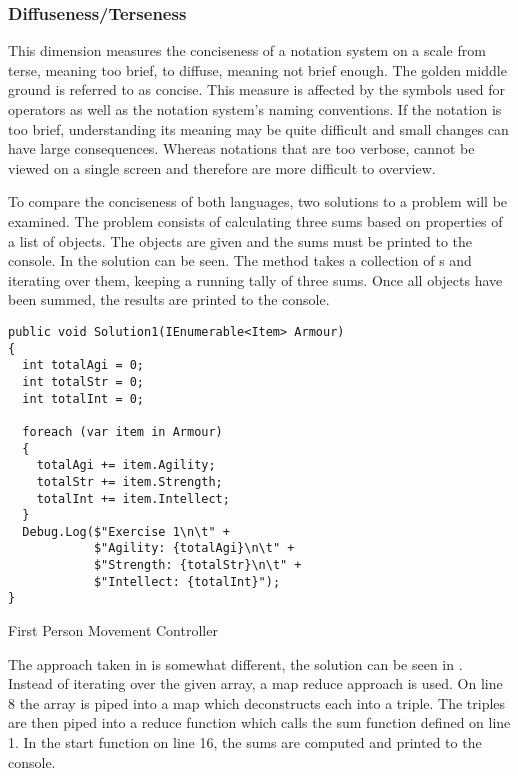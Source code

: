 \subsubsection{Diffuseness/Terseness} %
This dimension measures the conciseness of a notation system on a scale from terse, meaning too brief, to diffuse, meaning not brief enough. The golden middle ground is referred to as concise. This measure is affected by the symbols used for operators as well as the notation system's naming conventions. If the notation is too brief, understanding its meaning may be quite difficult and small changes can have large consequences. Whereas notations that are too verbose, cannot be viewed on a single screen and therefore are more difficult to overview.

To compare the conciseness of both languages, two solutions to a problem will be examined. The problem consists of calculating three sums based on properties of a list of objects. The objects are given and the sums must be printed to the console. In  the \cs solution can be seen. The method takes a collection of s and iterating over them, keeping a running tally of three sums. Once all objects have been summed, the results are printed to the console.

\begin{listing}[H]
\begin{verbatim}
public void Solution1(IEnumerable<Item> Armour)
{
  int totalAgi = 0;
  int totalStr = 0;
  int totalInt = 0;

  foreach (var item in Armour)
  {
    totalAgi += item.Agility;
    totalStr += item.Strength;
    totalInt += item.Intellect;
  }
  Debug.Log($"Exercise 1\n\t" +
            $"Agility: {totalAgi}\n\t" +
            $"Strength: {totalStr}\n\t" +
            $"Intellect: {totalInt}");
}
\end{verbatim}
\caption{First Person Movement Controller \cs}
\label{lst:cs-armour}
\end{listing}

The approach taken in \fs is somewhat different, the solution can be seen in . Instead of iterating over the given array, a map reduce approach is used. On line 8 the array is piped into a map which deconstructs each  into a triple. The triples are then piped into a reduce function which calls the sum function defined on line 1. In the start function on line 16, the sums are computed and printed to the console.

